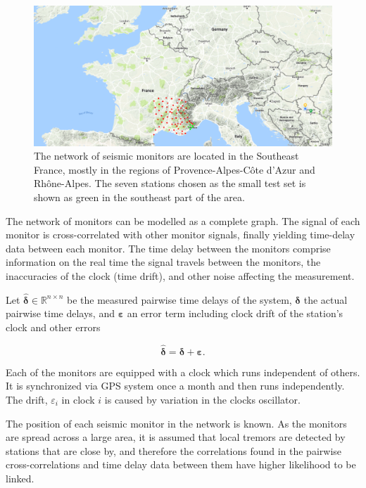 \documentclass[12pt,a4paper,english]{article}
\begin{document}
\begin{figure}[ht]
  \begin{center}   
   \includegraphics[width=\textwidth]{InitialStationSet.png}
  \end{center}
  \caption{The network of seismic monitors are located in the Southeast France, mostly in the regions of Provence-Alpes-C\^{o}te d'Azur and Rh\^{o}ne-Alpes. The seven stations chosen as the small test set is shown as green in the southeast part of the area.}\label{fig:monitornetwork}
\end{figure}

The network of monitors can be modelled as a complete graph. The signal of each monitor is cross-correlated with other monitor signals, finally yielding time-delay data between each monitor. The time delay between the monitors comprise information on the real time the signal travels between the monitors, the inaccuracies of the clock (time drift), and other noise affecting the measurement. 

Let $\bm{\hat{\delta}} \in \mathbb{R}^{n\times n}$ be the measured pairwise time delays of the system, $\bm{\delta}$ the actual pairwise time delays, and $\bm{\varepsilon}$ an error term including clock drift of the station's clock and other errors

\begin{equation}
\bm{\hat{\delta}}  = \bm{\delta} + \bm{\varepsilon}.
\label{eq:model}
\end{equation}
 
Each of the monitors are equipped with a clock which runs independent of others. It is synchronized via GPS system once a month and then runs independently. The drift, $\varepsilon_i$ in clock $i$ is caused by variation in the clocks oscillator.  

The position of each seismic monitor in the network is known. As the monitors are spread across a large area, it is assumed that local tremors are detected by stations that are close by, and therefore the correlations found in the pairwise cross-correlations and time delay data between them have higher likelihood to be linked. 
\end{document}
